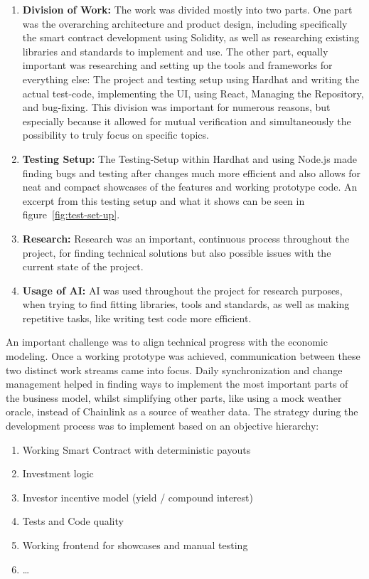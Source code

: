 \documentclass[11pt,a4paper]{article}
\begin{document}
	\begin{enumerate}[1]
		\item \textbf{Division of Work:} The work was divided mostly into two parts.
			One part was the overarching architecture and product design, including specifically the smart contract development using Solidity, as well as researching existing libraries and standards to implement and use.
			The other part, equally important was researching and setting up the tools and frameworks for everything else: The project and testing setup using Hardhat and writing the actual test-code, implementing the UI, using React, Managing the Repository, and bug-fixing.
			This division was important for numerous reasons, but especially because it allowed for mutual verification and simultaneously the possibility to truly focus on specific topics.
		\item \textbf{Testing Setup:} The Testing-Setup within Hardhat and using Node.js made finding bugs and testing after changes much more efficient and also allows for neat and compact showcases of the features and working prototype code.
			An excerpt from this testing setup and what it shows can be seen in figure~\ref{fig:test-set-up}.
		\item \textbf{Research:} Research was an important, continuous process throughout the project, for finding technical solutions but also possible issues with the current state of the project.
		\item \textbf{Usage of AI:} AI was used throughout the project for research purposes, when trying to find fitting libraries, tools and standards, as well as making repetitive tasks, like writing test code more efficient.
	\end{enumerate}

	An important challenge was to align technical progress with the economic modeling.
	Once a working prototype was achieved, communication between these two distinct work streams came into focus.
	Daily synchronization and change management helped in finding ways to implement the most important parts of the business model, whilst simplifying other parts, like using a mock weather oracle, instead of Chainlink as a source of weather data.
	The strategy during the development process was to implement based on an objective hierarchy:

	\begin{enumerate}[1]
		\item Working Smart Contract with deterministic payouts
		\item Investment logic
		\item Investor incentive model (yield / compound interest)
		\item Tests and Code quality
		\item Working frontend for showcases and manual testing
		\item \ldots
	\end{enumerate}
\end{document}

